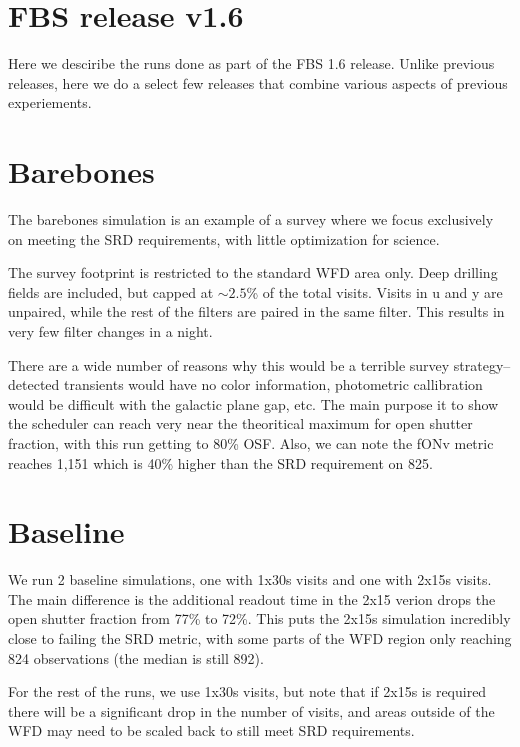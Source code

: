 
\section{FBS release v1.6}

Here we desciribe the runs done as part of the FBS 1.6 release.  Unlike previous releases, here we do a select few releases that combine various aspects of previous experiements.



\section{Barebones}

The barebones simulation is an example of a survey where we focus exclusively on meeting the SRD requirements, with little optimization for science.

The survey footprint is restricted to the standard WFD area only. Deep drilling fields are included, but capped at $\sim2.5$\% of the total visits. Visits in u and y are unpaired, while the rest of the filters are paired in the same filter. This results in very few filter changes in a night.

There are a wide number of reasons why this would be a terrible survey strategy--detected transients would have no color information, photometric callibration would be difficult with the galactic plane gap, etc.  The main purpose it to show the scheduler can reach very near the theoritical maximum for open shutter fraction, with this run getting to 80\% OSF. Also, we can note the fONv metric reaches 1,151 which is 40\% higher than the SRD requirement on 825.


\section{Baseline}

We run 2 baseline simulations, one with 1x30s visits and one with 2x15s visits.  The main difference is the additional readout time in the 2x15 verion drops the open shutter fraction from 77\% to 72\%. This puts the 2x15s simulation incredibly close to failing the SRD metric, with some parts of the WFD region only reaching 824 observations (the median is still 892). 

For the rest of the runs, we use 1x30s visits, but note that if 2x15s is required there will be a significant drop in the number of visits, and areas outside of the WFD may need to be scaled back to still meet SRD requirements.

